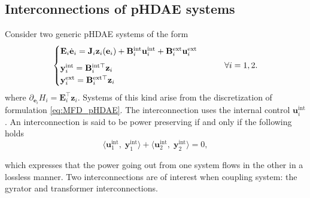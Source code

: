 \documentclass{svjour3}                     %
\begin{document}
\subsection{Interconnections of pHDAE systems}
Consider two generic pHDAE systems of the form
\begin{equation}
\begin{cases}
\mathbf{E}_i \dot{\mathbf{e}}_i = \mathbf{J}_i \mathbf{z}_i(\mathbf{e}_i) + \mathbf{B}_i^{\text{int}} \mathbf{u}_i^{\text{int}} + \mathbf{B}_i^{\text{ext}} \mathbf{u}_i^{\text{ext}}  \vspace{2mm} \\
\mathbf{y}_i^{\text{int}} = \mathbf{B}_i^{\text{int} \top}  \mathbf{z}_i \\
\mathbf{y}_i^{\text{ext}} = \mathbf{B}_i^{\text{ext} \top}  \mathbf{z}_i \\
\end{cases} \qquad \forall i = 1, 2.
\end{equation}
where $\partial_{\mathbf{e}_i} {H_i} = \mathbf{E}_i^\top \mathbf{z}_i$. Systems of this kind arise from the discretization of formulation \eqref{eq:MFD_pHDAE}. The interconnection uses the internal control $\mathbf{u}_i^{\text{int}}$. An interconnection is said to be power preserving if and only if the following holds
\begin{equation} \label{eq:int_balance}
\langle \mathbf{u}_1^{\text{int}}, \; \mathbf{y}_1^{\text{int}} \rangle + \langle \mathbf{u}_2^{\text{int}}, \; \mathbf{y}_2^{\text{int}} \rangle = 0,
\end{equation}

which expresses that the power going out from one system flows in the other in a lossless manner. Two interconnections are of interest when coupling system: the gyrator and transformer interconnections.
\end{document}
